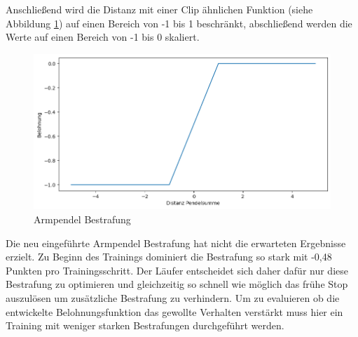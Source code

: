 Anschließend wird die Distanz mit einer Clip ähnlichen Funktion (siehe Abbildung \ref{fig:plot_hand_pendel}) auf einen Bereich von -1 bis 1 beschränkt, abschließend werden die Werte auf einen Bereich von -1 bis 0 skaliert.

\begin{figure}[H]
  \centering  
  \includegraphics[width=\textwidth]{img/plot_hand_pendel}
  \caption{Armpendel Bestrafung}
  \label{fig:plot_hand_pendel}
\end{figure}

Die neu eingeführte Armpendel Bestrafung hat nicht die erwarteten Ergebnisse erzielt. Zu Beginn des Trainings dominiert die Bestrafung so stark mit -0,48 Punkten pro Trainingsschritt. Der Läufer entscheidet sich daher dafür nur diese Bestrafung zu optimieren und gleichzeitig so schnell wie möglich das frühe Stop auszulösen um zusätzliche Bestrafung zu verhindern. Um zu evaluieren ob die entwickelte Belohnungsfunktion das gewollte Verhalten verstärkt muss hier ein Training mit weniger starken Bestrafungen durchgeführt werden.

